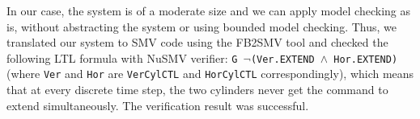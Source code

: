 \begin{bibunit}


In our case, the system is of a moderate size and we can apply model checking as is, without abstracting the system or using bounded model checking.
Thus, we translated our system to SMV code using the FB2SMV tool and checked the following LTL formula with NuSMV verifier: \texttt{G $\neg$(Ver.EXTEND $\land$ Hor.EXTEND)} (where \texttt{Ver} and \texttt{Hor} are \texttt{VerCylCTL} and \texttt{HorCylCTL} correspondingly), 
which means that at every discrete time step, the two cylinders never get the command to extend simultaneously. The verification result was successful. 







\end{bibunit}

